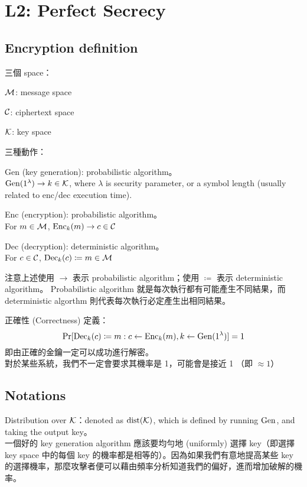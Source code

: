 \section{L2: Perfect Secrecy}


\subsection{Encryption definition}

三個 space：
\begin{myItemize}
	\item \(\operatorname{\mathcal{M}}\): message space
	\item \(\operatorname{\mathcal{C}}\): ciphertext space
	\item \(\operatorname{\mathcal{K}}\): key space
\end{myItemize}

三種動作：
\begin{myItemize}[itemsep=10pt]
	\item Gen (key generation): probabilistic algorithm。 \\
		\(\operatorname{Gen}(1^\lambda) \rightarrow k \in \operatorname{\mathcal{K}}\), where \(\lambda\) is security parameter, or a symbol length (usually related to enc/dec execution time).
	\item Enc (encryption): probabilistic algorithm。 \\
		For \(m \in \operatorname{\mathcal{M}}\), \(\operatorname{Enc}_{k}(m) \rightarrow c \in \operatorname{\mathcal{C}}\)
	\item Dec (decryption): deterministic algorithm。 \\
		For \(c \in \operatorname{\mathcal{C}}\), \(\operatorname{Dec}_{k}(c) \coloneq m \in \operatorname{\mathcal{M}}\)
\end{myItemize}

注意上述使用 \(\rightarrow\) 表示 probabilistic algorithm；使用 \(\coloneqq\) 表示 deterministic algorithm。
Probabilistic algorithm 就是每次執行都有可能產生不同結果，而 deterministic algorthm 則代表每次執行必定產生出相同結果。

正確性 (Correctness) 定義： \\
\[\Pr[ \operatorname{Dec}_{k}(c) \coloneqq m : c \leftarrow \operatorname{Enc}_{k}(m), k \leftarrow \operatorname{Gen}(1^\lambda) ] = 1\]
即由正確的金鑰一定可以成功進行解密。 \\
對於某些系統，我們不一定會要求其機率是 1，可能會是接近 1 （即 \( \approx 1\)）


\subsection{Notations}

Distribution over \(\operatorname{\mathcal{K}}\)：denoted as \(\operatorname{dist}(\operatorname{\mathcal{K}})\), which is defined by running \(\operatorname{Gen}\), and taking the output key。 \\
一個好的 key generation algorithm 應該要均勻地 (uniformly) 選擇 key（即選擇 key space 中的每個 key 的機率都是相等的）。因為如果我們有意地提高某些 key 的選擇機率，那麼攻擊者便可以藉由頻率分析知道我們的偏好，進而增加破解的機率。

